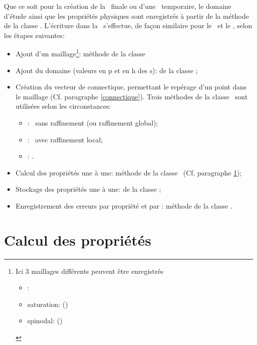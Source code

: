       Que ce soit pour la création de la \bdd\ finale ou d'une \bdd\ temporaire, le domaine d'étude ainsi que les propriétés
      physiques sont enregistrés à partir de la méthode  de la classe \IGEN. 
      L'écriture dans la \bdd\ s'effectue, de façon similaire pour le \pph\ et le \sgp, selon les étapes suivantes:
      \vspace{0.3cm}
      \begin{itemize}
       \item Ajout d'un maillage\footnote{Ici 3 maillages différents peuvent être enregistrés 
	  \begin{itemize}
	   \item \pph: 
	   \item saturation:  (\sgp)
	   \item spinodal:  (\sgp)
          \end{itemize}
	}: méthode  de la classe \MED
       \item Ajout du domaine (valeurs en p et en h des \n s):  de la classe \MED;
       \item Création du vecteur de connectique, permettant le repérage d'un point dans le maillage
       (Cf. paragraphe \ref{connectique}). Trois méthodes de la classe \MED\ sont utilisées selon les circonstances:
	\begin{itemize}
	  \item[\ding{213}] : \pph\ sans raffinement (ou raffinement global);
	  \item[\ding{213}] : \pph\ avec raffinement local;
	  \item[\ding{213}] : \sgp.
	\end{itemize}
       \vspace{0.3cm}
       \item Calcul des propriétés une à une: méthode  de la classe \EOS\ (Cf. paragraphe \ref{properte});
       \item Stockage des propriétés une à une:  de la classe \MED;
       \item Enregistrement des erreurs par propriété et par \n: méthode  de la classe \MED.
      \end{itemize}
      
      
      \section{Calcul des propriétés}\label{properte}
      
